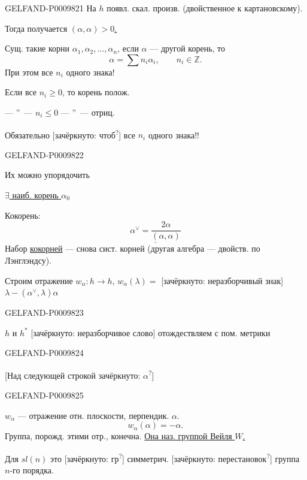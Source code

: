 \begin{GelfandAdjacentEvidence}{GELFAND-P000982}{1}
На $h$ появл. скал. произв. (двойственное к картановскому).

Тогда получается \underline{$(\alpha,\alpha)>0$.}

Сущ. такие корни $\alpha_1,\alpha_2,\ldots,\alpha_n$, если $\alpha$ --- другой корень, то
\[
\alpha=\sum n_i\alpha_i,\qquad n_i\in\mathbb Z.
\]
При этом все $n_i$ одного знака!

Если все $n_i\geq0$, то корень полож.

--- \textquotedblright\ --- $n_i\leq0$ --- \textquotedblright\ --- отриц.

Обязательно [зачёркнуто: чтоб\textsuperscript{?}] все $n_i$ одного знака!!
\end{GelfandAdjacentEvidence}
\begin{GelfandAdjacentEvidence}{GELFAND-P000982}{2}


Их можно упорядочить

\underline{$\exists$ наиб. корень $\alpha_0$}

Кокорень:
\[
\underline{\alpha^{\vee}=\frac{2\alpha}{(\alpha,\alpha)}}
\]
Набор \underline{кокорней} --- снова сист. корней (другая алгебра --- двойств. по Лэнглэндсу).

Строим отражение $w_\alpha\colon h\longrightarrow h$,
$w_\alpha(\lambda)=$ [зачёркнуто: неразборчивый знак]
$\lambda-(\alpha^{\vee},\lambda)\alpha$
\end{GelfandAdjacentEvidence}
\begin{GelfandAdjacentEvidence}{GELFAND-P000982}{3}


$h$ и $h^*$ [зачёркнуто: неразборчивое слово] отождествляем с пом. метрики
\end{GelfandAdjacentEvidence}
\begin{GelfandAdjacentEvidence}{GELFAND-P000982}{4}


[Над следующей строкой зачёркнуто: $\alpha$\textsuperscript{?}]
\end{GelfandAdjacentEvidence}
\begin{GelfandAdjacentEvidence}{GELFAND-P000982}{5}


$w_\alpha$ --- отражение отн. плоскости, перпендик. $\alpha$.
\[
w_\alpha(\alpha)=-\alpha.
\]
Группа, порожд. этими отр., конечна. \underline{Она наз. группой Вейля $W$.}

Для $sl(n)$ это [зачёркнуто: гр\textsuperscript{?}] симметрич. [зачёркнуто: перестановок\textsuperscript{?}] группа $n$-го порядка.
\end{GelfandAdjacentEvidence}

